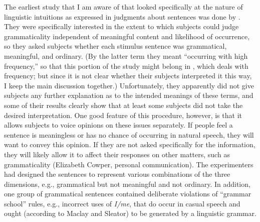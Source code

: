 The earliest study that I am aware of that looked specifically at the nature of linguistic intuitions as expressed in judgments about sentences was done by \citet{MaclayEtAl1960}. They were specifically interested in the extent to which subjects could judge grammaticality independent of meaningful content and likelihood of occurrence, so they asked subjects whether each stimulus sentence was grammatical, meaningful, and ordinary. (By the latter term they meant ``occurring with high frequency,'' so that this portion of the study might belong in , which deals with frequency; but since it is not clear whether their subjects interpreted it this way, I keep the main discussion together.) Unfortunately, they apparently did not give subjects any further explanation as to the intended meanings of these terms, and some of their results clearly show that at least some subjects did not take the desired interpretation. One good feature of this procedure, however, is that it allows subjects to voice opinions on these issues separately. If people feel a sentence is meaningless or has no chance of occurring in natural speech, they will want to convey this opinion. If they are not asked specifically for the information, they will likely allow it to affect their responses on other matters, such as grammaticality (Elizabeth Cowper, personal communication). The experimenters had designed the sentences to represent various combinations of the three dimensions, e.g., grammatical but not meaningful and not ordinary. In addition, one group of grammatical sentences contained deliberate violations of ``grammar school'' rules, e.g., incorrect uses of \textit{I/me}, that do occur in casual speech and ought (according to Maclay and Sleator) to be generated by a linguistic grammar.


